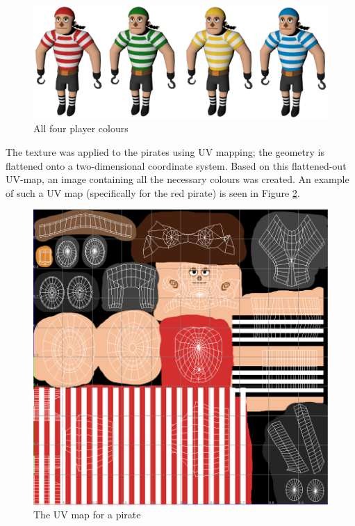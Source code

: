 \begin{figure}[h!]
	\centering
	\includegraphics[width=\textwidth]{figures/pirate_rainbow.png}
	\caption{All four player colours \label{fig:pirate_rainbow}}
\end{figure}

The texture was applied to the pirates using UV mapping; the geometry is flattened onto a two-dimensional coordinate system. Based on this flattened-out UV-map, an image containing all the necessary colours was created. An example of such a UV map (specifically for the red pirate) is seen in Figure \ref{fig:uv_map}.

\begin{figure}[h!]
	\centering
	\includegraphics[width=\textwidth]{figures/uv_map.png}
	\caption{The UV map for a pirate \label{fig:uv_map}}
\end{figure}

